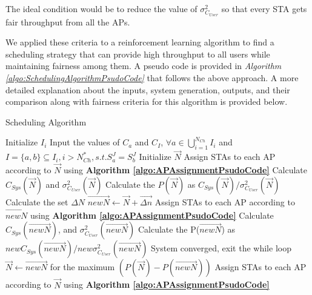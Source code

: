 The ideal condition would be to reduce the value of $\sigma_{C_{User}}^2$ so that every STA gets fair throughput from all the APs.

We applied these criteria to a reinforcement learning algorithm to find a scheduling strategy that can provide high throughput to all users while maintaining fairness among them.
A pseudo code is provided in \textit{Algorithm \ref{algo:SchedulingAlgorithmPsudoCode}} that follows the above approach. A more detailed explanation about the inputs, system generation, outputs, and their comparison along with fairness criteria for this algorithm is provided below.




%
%
\begin{algorithm}[h]
        \caption{Scheduling Algorithm}
    \label{algo:SchedulingAlgorithmPsudoCode}
    \begin{algorithmic}[1]
        \State Initialize $I_i$
        \State Input the values of $C_a$ and $C_I$, $\forall a \in \bigcup\limits_{i=1}^{N_{Ch}} I_{i}$ and $I=\{a,b\} \subseteq I_i, i > N_{Ch}^*, s.t. S_a^J=S_b^J$
        \State Initialize $\Vec{N}$
        \State Assign STAs to each AP according to $\vec{N}$ using \textbf{Algorithm \ref{algo:APAssignmentPsudoCode}}
        \State Calculate $C_{Sys}(\vec{N})$ and $\sigma^2_{C_{User}}(\vec{N})$
        \State Calculate the $P(\vec{N})$ as $C_{Sys}(\vec{N}) / \sigma^2_{C_{User}}(\vec{N})$
        \State Calculate the set $\Delta {N}$
                \State $\overrightarrow{newN} \gets \vec{N} + \overrightarrow{\Delta n}$
                \State Assign STAs to each AP according to $\overrightarrow{newN}$ using \textbf{Algorithm \ref{algo:APAssignmentPsudoCode}}
                \State Calculate $C_{Sys}(\overrightarrow{newN})$, and $\sigma^2_{C_{User}}(\overrightarrow{newN})$
                \State Calculate the P($\overrightarrow{newN}$) as $newC_{Sys}(\overrightarrow{newN}) / new\sigma^2_{C_{User}}(\overrightarrow{newN})$
            \EndFor
                \State System converged, exit the while loop
            \Else
                \State $\vec{N} \gets \overrightarrow{newN}$ for the maximum $(P(\vec{N}) - P(\overrightarrow{newN}))$
                \State Assign STAs to each AP according to $\vec{N}$ using \textbf{Algorithm \ref{algo:APAssignmentPsudoCode}}
            \EndIf
        \EndWhile
    \end{algorithmic}
\end{algorithm}



